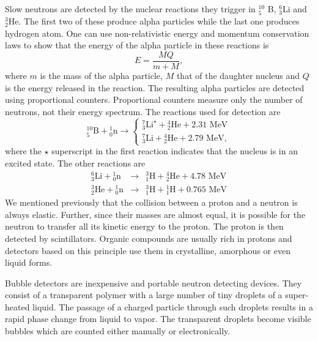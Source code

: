 \documentclass{article}
\numberwithin{equation}{section}
\begin{document}
Slow neutrons are detected by the nuclear reactions they trigger in ${}^{10}_5$
B, ${}^6_3$Li and ${}^3_2$He. The first two of these produce alpha particles
while the last one produces hydrogen atom. One can use non-relativistic energy
and momentum conservation laws to show that the energy of the alpha particle
in these reactions is \cite{turner2008atoms}
\begin{equation}\label{s5e1}
E = \frac{MQ}{m + M},
\end{equation}
where $m$ is the mass of the alpha particle, $M$ that of the daughter 
nucleus and $Q$ is the energy released in the reaction. The resulting alpha
particles are detected using proportional counters. Proportional counters
measure only the number of neutrons, not their energy spectrum. The reactions
used for detection are \cite{crane1991neutron}
\begin{equation}\label{s5e2}
{}^{10}_5\text{B}+{}^1_0\text{n} \rightarrow \begin{cases}
{}^7_3\text{Li}^\star + {}^4_2\text{He} + 2.31\text{ MeV} \\
{}^7_3\text{Li} + {}^4_2\text{He} + 2.79\text{ MeV}, 
\end{cases}
\end{equation}
where the $\star$ superscript in the first reaction indicates that the nucleus
is in an excited state. The other reactions are
\begin{eqnarray}
{}^6_3\text{Li}+{}^1_0\text{n}&\rightarrow&{}^3_1\text{H} + {}^4_2\text{He} +
4.78\text{ MeV} \label{s5e3} \\
{}^3_2\text{He}+{}^1_0\text{n}&\rightarrow&{}^3_1\text{H} + {}^1_1\text{H} +
0.765\text{ MeV} \label{s5e4} 
\end{eqnarray}
We mentioned previously that the collision between a proton and a neutron is
always elastic. Further, since their masses are almost equal, it is possible
for the neutron to transfer all its kinetic energy to the proton. The proton
is then detected by scintillators. Organic compounds are usually rich in 
protons and detectors based on this principle use them in crystalline, 
amorphous or even liquid forms. 

Bubble detectors are inexpensive and portable neutron detecting devices. They
consist of a transparent polymer with a large number of tiny droplets of 
a super-heated liquid. The passage of a charged particle through such droplets
results in a rapid phase change from liquid to vapor. The transparent droplets
become visible bubbles which are counted either manually or electronically.
\end{document}
